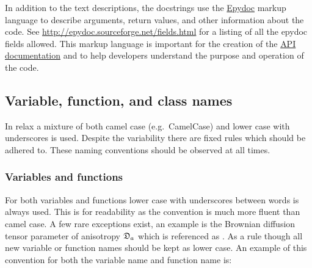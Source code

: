 In addition to the text descriptions, the docstrings use the \href{http://epydoc.sourceforge.net/}{Epydoc} markup language to describe arguments, return values, and other information about the code.
See \url{http://epydoc.sourceforge.net/fields.html} for a listing of all the epydoc fields allowed.
This markup language is important for the creation of the \href{http://www.nmr-relax.com/api/}{API documentation} and to help developers understand the purpose and operation of the code.


\subsection{Variable, function, and class names}

In relax a mixture of both camel case (e.g.\ CamelCase) and lower case with underscores is used.
Despite the variability there are fixed rules which should be adhered to.
These naming conventions should be observed at all times.



\subsubsection{Variables and functions}

For both variables and functions lower case with underscores between words is always used.
This is for readability as the convention is much more fluent than camel case.
A few rare exceptions exist, an example is the Brownian diffusion tensor parameter of anisotropy $\mathfrak{D}_a$ which is referenced as .
As a rule though all new variable or function names should be kept as lower case.
An example of this convention for both the variable name and function name is:

